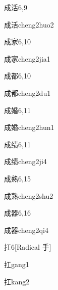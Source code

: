\begin{entry}{成活}{6,9}
  \begin{phonetics}{成活}{cheng2huo2}
  \end{phonetics}
\end{entry}

\begin{entry}{成家}{6,10}
  \begin{phonetics}{成家}{cheng2jia1}
  \end{phonetics}
\end{entry}

\begin{entry}{成都}{6,10}
  \begin{phonetics}{成都}{cheng2du1}
  \end{phonetics}
\end{entry}

\begin{entry}{成婚}{6,11}
  \begin{phonetics}{成婚}{cheng2hun1}
  \end{phonetics}
\end{entry}

\begin{entry}{成绩}{6,11}
  \begin{phonetics}{成绩}{cheng2ji4}
  \end{phonetics}
\end{entry}

\begin{entry}{成熟}{6,15}
  \begin{phonetics}{成熟}{cheng2shu2}
  \end{phonetics}
\end{entry}

\begin{entry}{成器}{6,16}
  \begin{phonetics}{成器}{cheng2qi4}
  \end{phonetics}
\end{entry}

\begin{entry}{扛}{6}[Radical 手]
  \begin{phonetics}{扛}{gang1}
  \end{phonetics}
  \begin{phonetics}{扛}{kang2}
  \end{phonetics}
\end{entry}

